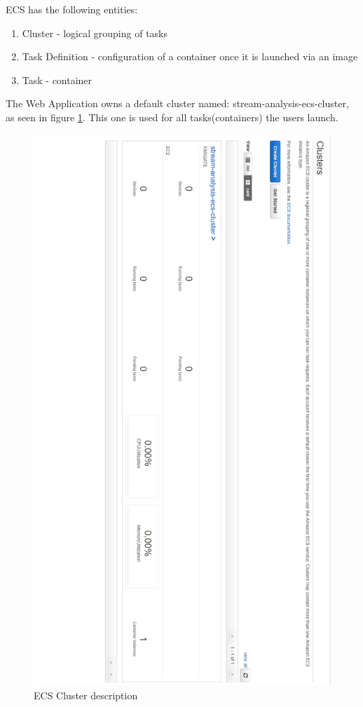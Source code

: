 \newpage

ECS has the following entities:

\begin{enumerate}
	\item Cluster - logical grouping of tasks 
	\item Task Definition - configuration of a container once it is launched via an image
	\item Task - container
\end{enumerate}

The Web Application owns a default cluster named: stream-analysis-ecs-cluster, as seen in figure \ref{fig:ecs-cluster}. This one is used for all tasks(containers) the users launch.

\begin{figure}[p]
	\centering
	\noindent
	\includegraphics[width=0.5\paperwidth]{./images/aws_resources/ECSCluster.PNG}
	\caption{ECS Cluster description}
	\label{fig:ecs-cluster}
\end{figure}

